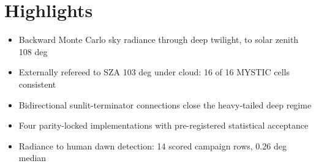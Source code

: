 \documentclass{article}
\begin{document}
\section*{Highlights}
\begin{itemize}
\item Backward Monte Carlo sky radiance through deep twilight, to solar zenith 108 deg
\item Externally refereed to SZA 103 deg under cloud: 16 of 16 MYSTIC cells consistent
\item Bidirectional sunlit-terminator connections close the heavy-tailed deep regime
\item Four parity-locked implementations with pre-registered statistical acceptance
\item Radiance to human dawn detection: 14 scored campaign rows, 0.26 deg median
\end{itemize}
\end{document}
